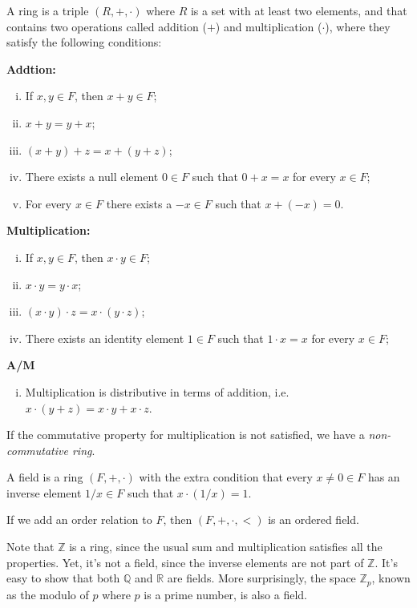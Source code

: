 \begin{definition}[Ring]
	A ring is a triple $(R, +, \cdot)$ where $R$ is a set with at least two elements,
	and that contains two operations called addition ($+$) and multiplication ($\cdot$),
	where they satisfy the following conditions:

	\textbf{Addtion:}
	\begin{enumerate}[(i)]
		\item If $x, y \in F$, then $x+y \in F$;
		\item $x + y = y + x$;
		\item $(x + y) + z = x + (y + z)$;
		\item There exists a null element $0 \in F$ such that $0 + x = x$ for every $x \in F$;
		\item For every $x\in F$ there exists a $-x \in F$ such that $x + (-x) = 0$.
	\end{enumerate}

	\textbf{Multiplication:}
	\begin{enumerate}[(i)]
		\item If $x, y \in F$, then $x\cdot y \in F$;
		\item $x \cdot y = y \cdot x$;
		\item $(x \cdot y) \cdot z = x \cdot (y \cdot z)$;
		\item There exists an identity element $1\in F$ such that $1 \cdot x = x$ for every $x \in F$;
	\end{enumerate}

	\textbf{A/M}
	\begin{enumerate}[(i)]
		\item Multiplication is distributive in terms of addition, i.e.
		      $x\cdot(y+z) = x \cdot y + x \cdot z$.
	\end{enumerate}
	If the commutative property for multiplication is not satisfied, we have a \textit{non-commutative ring}.
\end{definition}

\begin{definition}[Field]
	A field is a ring $(F, +, \cdot)$ with the extra condition that
	every $x \neq 0 \in F$ has  an inverse element $1/x \in F$ such that $x \cdot (1/x) = 1$.

	If we add an order relation to $F$, then $(F, +, \cdot, <)$ is an ordered field.
\end{definition}

\begin{example}
	Note that $\mathbb Z$ is a ring, since the usual sum and multiplication
	satisfies all the properties. Yet, it's not a field, since the inverse
	elements are not part of $\mathbb Z$. It's easy to show
	that both $\mathbb Q$ and $\mathbb R$ are fields. More surprisingly,
	the space $\mathbb Z_{p}$, known as the modulo of $p$ where $p$ is a prime number, is also
	a field.
\end{example}

